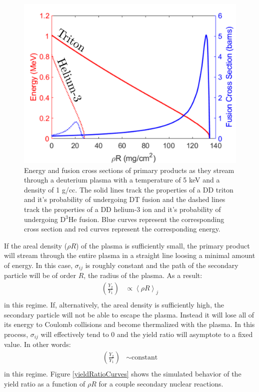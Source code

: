 	\begin{figure}[!h]
		\centering
		\includegraphics[scale=0.6]{Figures/secondaryCrossSection}
		\caption[Secondary fusion cross sections]{Energy and fusion cross sections of primary products as they stream through a deuterium plasma with a temperature of 5 keV and a density of 1 g/cc. The solid lines track the properties of a DD triton and it's probability of undergoing DT fusion and the dashed lines track the properties of a DD helium-3 ion and it's probability of undergoing D$^3$He fusion. Blue curves represent the corresponding cross section and red curves represent the corresponding energy.  }
		\label{secondaryCrossSection}
	\end{figure}
	
	 If the areal density ($\rho R$) of the plasma is sufficiently small, the primary product will stream through the entire plasma in a straight line loosing a minimal amount of energy. In this case, $\sigma_{ij}$ is roughly constant and the path of the secondary particle will be of order $R$, the radius of the plasma. As a result:
	\begin{equation}
		\begin{split}
			\left(\frac{Y_2}{Y_1}\right) 
			& \propto \left<\rho R\right>_j \\
		\end{split}
	\end{equation}
	in this regime. If, alternatively, the areal density is sufficiently high, the secondary particle will not be able to escape the plasma. Instead it will lose all of its energy to Coulomb collisions and become thermalized with the plasma. In this process, $\sigma_{ij}$ will effectively tend to 0 and the yield ratio will asymptote to a fixed value. In other words:
	\begin{equation}
		\begin{split}
			\left(\frac{Y_2}{Y_1}\right) 
			& \sim \text{constant} \\
		\end{split}
	\end{equation}
	in this regime.	Figure \ref{yieldRatioCurves} shows the simulated behavior of the yield ratio as a function of $\rho R$ for a couple secondary nuclear reactions. 
	

